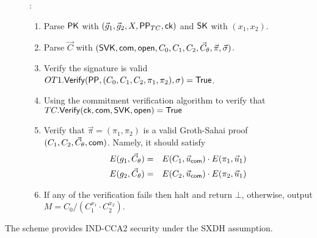 \begin{description}
\item[]:
  \begin{enumerate}
  \item Parse $\mathsf{PK}$ with $(\vec{g}_1, \vec{g}_2, X, \mathsf{PP}_{TC}, \mathsf{ck})$ and $\mathsf{SK}$ with $(x_1, x_2)$.
  \item Parse $\vec{C}$ with $ (\mathsf{SVK}, \mathsf{com}, \mathsf{open}, C_0, C_1, C_2, \vec{C}_{\theta}, \vec{\pi}, \vec{\sigma})$.
  \item Verify the signature is valid $OT1.{\mathsf{Verify}}(\mathsf{PP},  (C_0, C_1, C_2, \pi_1,\pi_2), \sigma) = \mathsf{True}$.
  \item Using the commitment verification algorithm to verify that $TC.{\mathsf{Verify}}(\mathsf{ck}, \mathsf{com}, \mathsf{SVK}, \mathsf{open}) = \mathsf{True}$
  \item Verify that $\vec{\pi}=(\pi_1,\pi_2)$ is a valid Groth-Sahai proof \wrt  $(C_1, C_2, \vec{C}_{\theta}, \mathsf{com})$. Namely, 
    it should satisfy 
    \begin{eqnarray} \label{ver-eq} 
      E(g_1,\vec{C}_{\theta}) &=& E(C_1 , \vec{u}_{\mathsf{com}}) \cdot E(\pi_1,\vec{u}_1) \\ \nonumber
      E(g_2,\vec{C}_{\theta}) &=& E(C_2 , \vec{u}_{\mathsf{com}}) \cdot E(\pi_2,\vec{u}_1)
    \end{eqnarray}
  \item If any of the verification fails then halt and return $\bot$, otherwise, output $M=C_0/(C_1^{x_1}\cdot C_2^{x_2})$.
  \end{enumerate}
  
\end{description}


\begin{myTh}
  The scheme provides IND-CCA2 security under the SXDH assumption.
\end{myTh}
\iffalse


